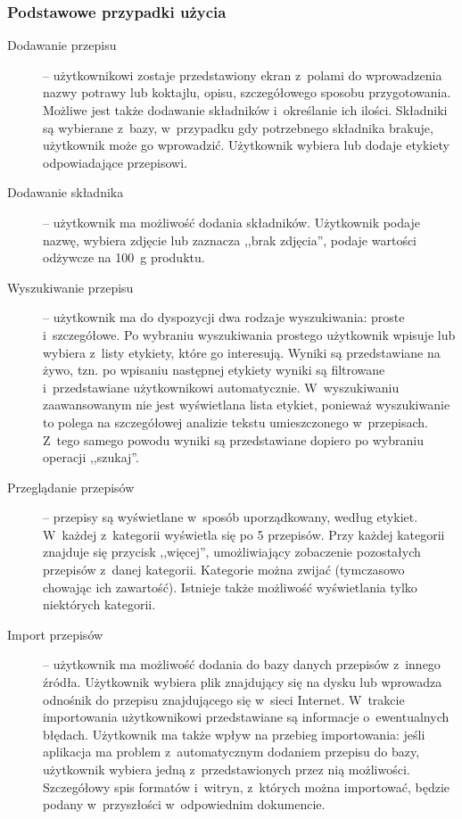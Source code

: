 \documentclass[12pt,leqno, twoside]{mwart}
\begin{document}
\subsubsection{Podstawowe przypadki użycia}
\begin{description}
\item[Dodawanie przepisu] -- użytkownikowi zostaje przedstawiony ekran z~polami do wprowadzenia nazwy potrawy lub koktajlu, opisu, szczegółowego sposobu przygotowania. Możliwe jest także dodawanie składników i~określanie ich ilości. Składniki są wybierane z~bazy, w~przypadku gdy potrzebnego składnika brakuje, użytkownik może go wprowadzić. Użytkownik wybiera lub dodaje etykiety odpowiadające przepisowi.
\item[Dodawanie składnika] -- użytkownik ma możliwość dodania składników. Użytkownik podaje nazwę, wybiera zdjęcie lub zaznacza ,,brak zdjęcia'', podaje wartości odżywcze na 100~g produktu.
\item[Wyszukiwanie przepisu] -- użytkownik ma do dyspozycji dwa rodzaje wyszukiwania: proste i~szczegółowe. Po wybraniu wyszukiwania prostego użytkownik wpisuje lub wybiera z~listy etykiety, które go interesują. Wyniki są przedstawiane na żywo, tzn. po wpisaniu następnej etykiety wyniki są filtrowane i~przedstawiane użytkownikowi automatycznie. W~wyszukiwaniu zaawansowanym nie jest wyświetlana lista etykiet, ponieważ wyszukiwanie to polega na szczegółowej analizie tekstu umieszczonego w~przepisach. Z~tego samego powodu wyniki są przedstawiane dopiero po wybraniu operacji ,,szukaj''.
\item[Przeglądanie przepisów] -- przepisy są wyświetlane w~sposób uporządkowany, według etykiet. W~każdej z~kategorii wyświetla się po 5 przepisów. Przy każdej kategorii znajduje się przycisk ,,więcej'', umożliwiający zobaczenie pozostałych przepisów z~danej kategorii. Kategorie można zwijać (tymczasowo chowając ich zawartość). Istnieje także możliwość wyświetlania tylko niektórych kategorii.
\item[Import przepisów] -- użytkownik ma możliwość dodania do bazy danych przepisów z~innego źródła. Użytkownik wybiera plik znajdujący się na dysku lub wprowadza odnośnik do przepisu znajdującego się w~sieci Internet. W~trakcie importowania użytkownikowi przedstawiane są informacje o~ewentualnych błędach. Użytkownik ma także wpływ na przebieg importowania: jeśli aplikacja ma problem z~automatycznym dodaniem przepisu do bazy, użytkownik wybiera jedną z~przedstawionych przez nią możliwości. Szczegółowy spis formatów i~witryn, z~których można importować, będzie podany w~przyszłości w~odpowiednim dokumencie.
\end{description}
\end{document}

